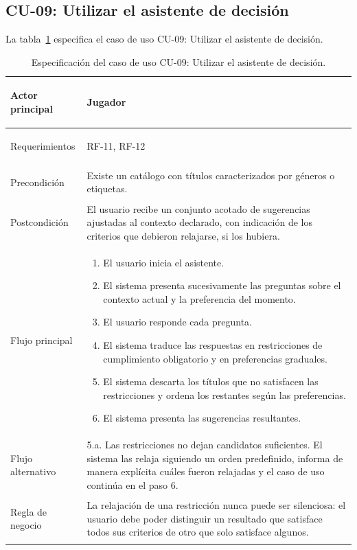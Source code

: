 \subsection{CU-09: Utilizar el asistente de decisión}\label{subsec:cu09}

La tabla~\ref{tab:cu09} especifica el caso de uso CU-09: Utilizar el asistente de decisión.

\begin{longtable}{|>{\bfseries\raggedright\arraybackslash}p{2.8cm}|>{\raggedright\arraybackslash}p{10cm}|}
	\caption{Especificación del caso de uso CU-09: Utilizar el asistente de decisión.}\label{tab:cu09} \\
	\hline
	\endfirsthead
	\hline
	\endfoot
	\hline
	\endlastfoot
	Actor principal & Jugador \\
	\hline
	Requerimientos & RF-11, RF-12 \\
	\hline
	Precondición & Existe un catálogo con títulos caracterizados por géneros o etiquetas. \\
	\hline
	Postcondición & El usuario recibe un conjunto acotado de sugerencias ajustadas al contexto declarado, con indicación de los criterios que debieron relajarse, si los hubiera. \\
	\hline
	Flujo principal &
	\begin{enumerate}[leftmargin=1.1em, itemsep=2pt, topsep=2pt]
		\item El usuario inicia el asistente.
		\item El sistema presenta sucesivamente las preguntas sobre el contexto actual y la preferencia del momento.
		\item El usuario responde cada pregunta.
		\item El sistema traduce las respuestas en restricciones de cumplimiento obligatorio y en preferencias graduales.
		\item El sistema descarta los títulos que no satisfacen las restricciones y ordena los restantes según las preferencias.
		\item El sistema presenta las sugerencias resultantes.
	\end{enumerate} \\
	\hline
	Flujo alternativo & 5.a. Las restricciones no dejan candidatos suficientes. El sistema las relaja siguiendo un orden predefinido, informa de manera explícita cuáles fueron relajadas y el caso de uso continúa en el paso 6. \\
	\hline
	Regla de negocio & La relajación de una restricción nunca puede ser silenciosa: el usuario debe poder distinguir un resultado que satisface todos sus criterios de otro que solo satisface algunos. \\
\end{longtable}

